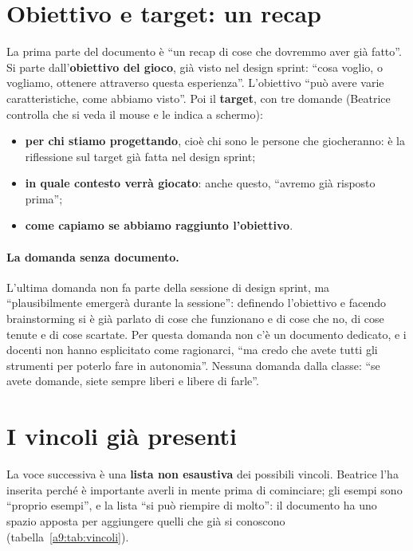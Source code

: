 \section{Obiettivo e target: un recap}
\label{a9:sec:obiettivo}



La prima parte del documento è ``un recap di cose che dovremmo aver già fatto''. Si
parte dall'\textbf{obiettivo del gioco}, già visto nel design sprint: ``cosa voglio, o
vogliamo, ottenere attraverso questa esperienza''. L'obiettivo ``può avere varie
caratteristiche, come abbiamo visto''. Poi il \textbf{target}, con tre domande
(Beatrice controlla che si veda il mouse e le indica a schermo):
\begin{itemize}
  \item \textbf{per chi stiamo progettando}, cioè chi sono le persone che giocheranno:
        è la riflessione sul target già fatta nel design sprint;
  \item \textbf{in quale contesto verrà giocato}: anche questo, ``avremo già
        risposto prima'';
  \item \textbf{come capiamo se abbiamo raggiunto l'obiettivo}.
\end{itemize}

\paragraph{La domanda senza documento.} L'ultima domanda non fa parte della sessione di
design sprint, ma ``plausibilmente emergerà durante la sessione'': definendo
l'obiettivo e facendo brainstorming si è già parlato di cose che funzionano e di cose
che no, di cose tenute e di cose scartate. Per questa domanda non c'è un documento
dedicato, e i docenti non hanno esplicitato come ragionarci, ``ma credo che avete
tutti gli strumenti per poterlo fare in autonomia''. Nessuna domanda dalla classe:
``se avete domande, siete sempre liberi e libere di farle''.

\section{I vincoli già presenti}
\label{a9:sec:vincoli}

La voce successiva è una \textbf{lista non esaustiva} dei possibili vincoli. Beatrice
l'ha inserita perché è importante averli in mente prima di cominciare; gli esempi
sono ``proprio esempi'', e la lista ``si può riempire di molto'': il documento ha uno
spazio apposta per aggiungere quelli che già si conoscono
(tabella~\ref{a9:tab:vincoli}).

